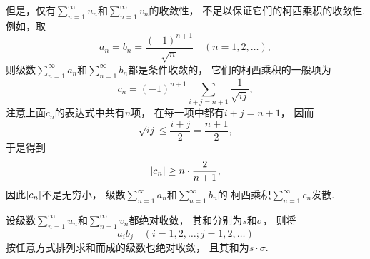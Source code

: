 但是，仅有\(\sum_{n=1}^\infty u_n\)和\(\sum_{n=1}^\infty v_n\)的收敛性，
不足以保证它们的柯西乘积的收敛性.
例如，取\begin{equation*}
	a_n = b_n = \frac{(-1)^{n+1}}{\sqrt{n}}
	\quad(n=1,2,\dotsc),
\end{equation*}
则级数\(\sum_{n=1}^\infty a_n\)和\(\sum_{n=1}^\infty b_n\)都是条件收敛的，
它们的柯西乘积的一般项为\begin{equation*}
	c_n = (-1)^{n+1} \sum_{i+j=n+1} \frac1{\sqrt{ij}},
\end{equation*}
注意上面\(c_n\)的表达式中共有\(n\)项，
在每一项中都有\(i+j = n+1\)，
因而\begin{equation*}
	\sqrt{ij} \leq \frac{i+j}2 = \frac{n+1}2,
\end{equation*}
于是得到\begin{equation*}
	\abs{c_n} \geq n \cdot \frac2{n+1},
\end{equation*}
因此\(\abs{c_n}\)不是无穷小，
级数\(\sum_{n=1}^\infty a_n\)和\(\sum_{n=1}^\infty b_n\)的
柯西乘积\(\sum_{n=1}^\infty c_n\)发散.

\begin{theorem}\label{theorem:无穷级数.绝对收敛级数的柯西乘积必收敛}
设级数\(\sum_{n=1}^\infty u_n\)和\(\sum_{n=1}^\infty v_n\)都绝对收敛，
其和分别为\(s\)和\(\sigma\)，
则将\begin{equation*}
	a_i b_j
	\quad(i=1,2,\dotsc;j=1,2,\dotsc)
\end{equation*}按任意方式排列求和而成的级数也绝对收敛，
且其和为\(s \cdot \sigma\).
\end{theorem}

